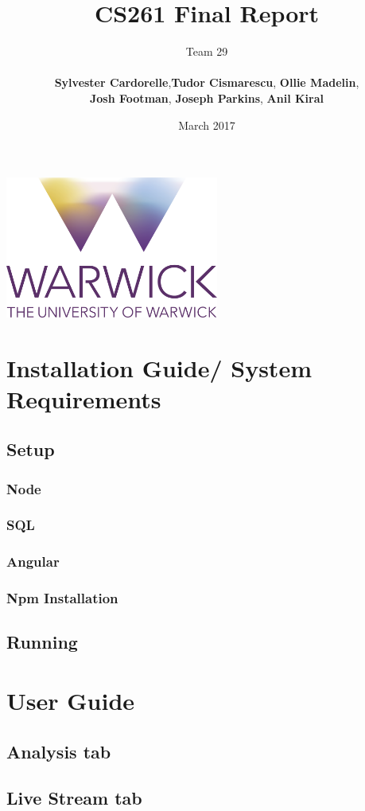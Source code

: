 \documentclass[12pt]{article}
\title{CS261 Final Report}
\author{Team 29 \\\\ \textbf{Sylvester Cardorelle},\textbf{Tudor Cismarescu}, \textbf{Ollie Madelin},\\
\textbf{Josh Footman}, \textbf{Joseph Parkins}, \textbf{Anil Kiral}}
\date{March 2017}
\begin{document}
\begin{titlepage}
\maketitle
\centering
\vfill
\vfill
\includegraphics[width=7cm]{logo.png}
\vfill
\vfill
\thispagestyle{empty}
\end{titlepage}
\tableofcontents
\section{Installation Guide/ System Requirements}
	\subsection{Setup}
		\subsubsection{Node}
    \subsubsection{SQL}
    \subsubsection{Angular}
    \subsubsection{Npm Installation}
  \subsection{Running}
\section{User Guide}
  \subsection{Analysis tab}
  \subsection{Live Stream tab}
\end{document}
